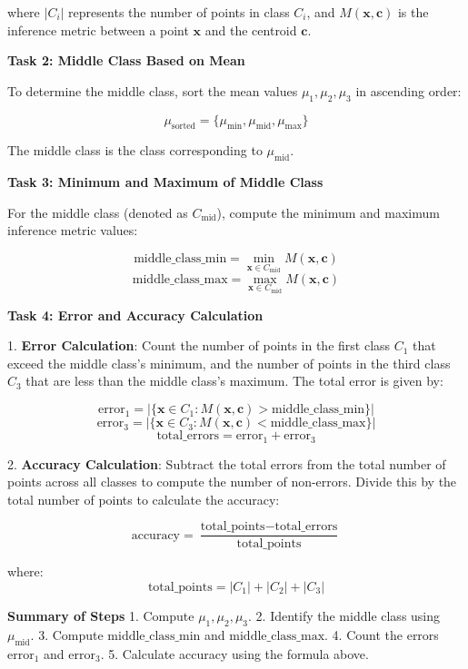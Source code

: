 where \( |C_i| \) represents the number of points in class \( C_i \), and \( M(\mathbf{x}, \mathbf{c}) \) is the inference metric between a point \( \mathbf{x} \) and the centroid \( \mathbf{c} \).

\textbf{Task 2: Middle Class Based on Mean}

To determine the middle class, sort the mean values \( \mu_1, \mu_2, \mu_3 \) in ascending order:

\[
\mu_{\text{sorted}} = \{\mu_{\text{min}}, \mu_{\text{mid}}, \mu_{\text{max}}\}
\]

The middle class is the class corresponding to \( \mu_{\text{mid}} \).

\textbf{Task 3: Minimum and Maximum of Middle Class}

For the middle class (denoted as \( C_{\text{mid}} \)), compute the minimum and maximum inference metric values:

\[
\text{middle\_class\_min} = \min_{\mathbf{x} \in C_{\text{mid}}} M(\mathbf{x}, \mathbf{c})
\]
\[
\text{middle\_class\_max} = \max_{\mathbf{x} \in C_{\text{mid}}} M(\mathbf{x}, \mathbf{c})
\]

\textbf{Task 4: Error and Accuracy Calculation}

1. \textbf{Error Calculation}: Count the number of points in the first class \( C_1 \) that exceed the middle class's minimum, and the number of points in the third class \( C_3 \) that are less than the middle class's maximum. The total error is given by:

\[
\text{error}_1 = \left| \{\mathbf{x} \in C_1 : M(\mathbf{x}, \mathbf{c}) > \text{middle\_class\_min} \} \right|
\]
\[
\text{error}_3 = \left| \{\mathbf{x} \in C_3 : M(\mathbf{x}, \mathbf{c}) < \text{middle\_class\_max} \} \right|
\]
\[
\text{total\_errors} = \text{error}_1 + \text{error}_3
\]

2. \textbf{Accuracy Calculation}: Subtract the total errors from the total number of points across all classes to compute the number of non-errors. Divide this by the total number of points to calculate the accuracy:

\[
\text{accuracy} = \frac{\text{total\_points} - \text{total\_errors}}{\text{total\_points}}
\]

where:
\[
\text{total\_points} = |C_1| + |C_2| + |C_3|
\]

\textbf{Summary of Steps}
1. Compute \( \mu_1, \mu_2, \mu_3 \).
2. Identify the middle class using \( \mu_{\text{mid}} \).
3. Compute \( \text{middle\_class\_min} \) and \( \text{middle\_class\_max} \).
4. Count the errors \( \text{error}_1 \) and \( \text{error}_3 \).
5. Calculate accuracy using the formula above.




